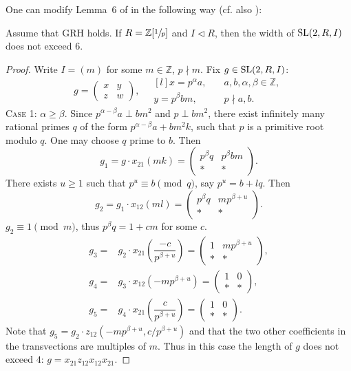 One can modify Lemma~6 of \cite{VavSmSuUnitrEng} in the following way (cf. also \cite{VseUnitrZ1p}):

\begin{lemma}\label{lemma:Z1p}
Assume that GRH holds. If $R=\mathbb{Z}[\sfrac{1}{p}]$ and $I\lhd R$, then the width of $\operatorname{SL}(2,R,I)$ does not exceed $6$.
\end{lemma}

\begin{proof}
Write $I=(m)$ for some $m\in\mathbb{Z}$, $p\nmid m$. Fix $g\in\operatorname{SL}(2,R,I)$:
\[ g=\begin{pmatrix}x & y \\ z & w\end{pmatrix},\quad
\begin{matrix*}[l]
x=p^\alpha a,\quad & a,b,\alpha,\beta\in\mathbb{Z}, \\ y=p^\beta bm, & p\nmid a,b.
\end{matrix*}\]
\textsc{Case 1:} $\alpha\geqslant\beta$. Since $p^{\alpha-\beta}a\perp bm^2$ and $p\perp bm^2$, there exist infinitely many rational primes $q$ of the form $p^{\alpha-\beta}a+bm^2k$, such that $p$ is a primitive root modulo $q$. One may choose $q$ prime to $b$. Then
\[ g_1=g\cdot x_{21}(mk) =
\begin{pmatrix} p^\beta q & p^\beta bm \\ * & * \end{pmatrix}.\]
There exists $u\geqslant 1$ such that $p^u\equiv b\pmod q$, say $p^u=b+lq$. Then
\[ g_2 = g_1\cdot x_{12}(ml) =
\begin{pmatrix} p^\beta q & mp^{\beta+u} \\ * & * \end{pmatrix}. \]
$g_2\equiv 1\pmod m$, thus $p^\beta q=1+cm$ for some $c$.
\begin{align*}
g_3 = & g_2\cdot x_{21}\left(\dfrac{-c}{p^{\beta+u}}\right) =
\begin{pmatrix} 1 & mp^{\beta+u} \\ * & * \end{pmatrix}, \\
g_4 = & g_3\cdot x_{12}\left(-mp^{\beta+u}\right) =
\begin{pmatrix} 1 & 0 \\ * & * \end{pmatrix}, \\
g_5 = & g_4\cdot x_{21}\left(\dfrac{c}{p^{\beta+u}}\right) =
\begin{pmatrix} 1 & 0 \\ * & * \end{pmatrix}.
\end{align*}
Note that $g_5=g_2\cdot z_{12}\left(-mp^{\beta+u},c/p^{\beta+u}\right)$ and that the two other coefficients in the transvections are multiples of $m$. Thus in this case the length of $g$ does not exceed $4$: $g=x_{21}z_{12}x_{12}x_{21}$.


\end{proof}
